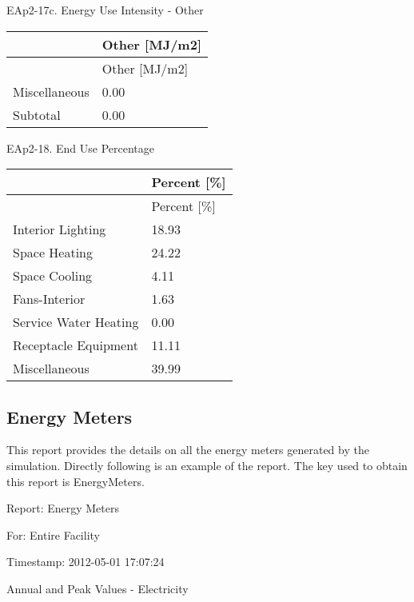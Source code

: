 EAp2-17c. Energy Use Intensity - Other

\begin{longtable}[c]{@{}ll@{}}
\toprule 
 & Other [MJ/m2] \tabularnewline
\midrule
\endfirsthead

\toprule 
 & Other [MJ/m2] \tabularnewline
\midrule
\endhead

Miscellaneous & 0.00 \tabularnewline
Subtotal & 0.00 \tabularnewline
\bottomrule
\end{longtable}

EAp2-18. End Use Percentage

\begin{longtable}[c]{@{}ll@{}}
\toprule 
 & Percent [\%] \tabularnewline
\midrule
\endfirsthead

\toprule 
 & Percent [\%] \tabularnewline
\midrule
\endhead

Interior Lighting & 18.93 \tabularnewline
Space Heating & 24.22 \tabularnewline
Space Cooling & 4.11 \tabularnewline
Fans-Interior & 1.63 \tabularnewline
Service Water Heating & 0.00 \tabularnewline
Receptacle Equipment & 11.11 \tabularnewline
Miscellaneous & 39.99 \tabularnewline
\bottomrule
\end{longtable}

\subsection{Energy Meters}\label{energy-meters}

This report provides the details on all the energy meters generated by the simulation. Directly following is an example of the report. The key used to obtain this report is EnergyMeters.

Report: Energy Meters

For: Entire Facility

Timestamp: 2012-05-01 17:07:24

Annual and Peak Values - Electricity

